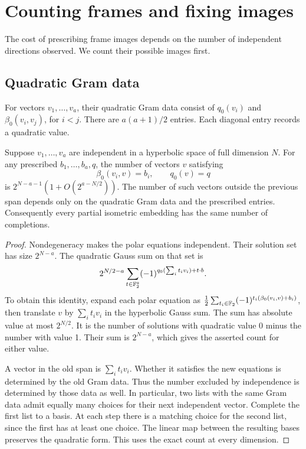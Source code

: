 \section{Counting frames and fixing images}\label{sec:frame-laws}

The cost of prescribing frame images depends on the number of independent
directions observed. We count their possible images first.

\subsection{Quadratic Gram data}

For vectors \(v_1,\ldots,v_a\), their quadratic Gram data consist of
\(q_0(v_i)\) and \(\beta_0(v_i,v_j)\), for \(i<j\).
There are \(a(a+1)/2\) entries. Each diagonal entry records a quadratic value.

\begin{lemma}\label{lem:quadratic-frame-count}
Suppose \(v_1,\ldots,v_a\) are independent in a hyperbolic space of
full dimension \(N\). For any prescribed \(b_1,\ldots,b_a,q\), the
number of vectors \(v\) satisfying
\[
 \beta_0(v_i,v)=b_i,\qquad q_0(v)=q
\]
is \(2^{N-a-1}(1+O(2^{a-N/2}))\). The number of such vectors outside
the previous span depends only on the quadratic Gram data and the
prescribed entries. Consequently every partial isometric embedding has
the same number of completions.
\end{lemma}
\begin{proof}
Nondegeneracy makes the polar equations independent. Their solution set
has size \(2^{N-a}\). The quadratic Gauss sum on that set is
\[
 2^{N/2-a}\sum_{t\in\mathbb F_2^a}
 (-1)^{q_0(\sum_i t_iv_i)+t\cdot b}.
\]
To obtain this identity, expand each polar equation as
\(\frac12\sum_{t_i\in\mathbb F_2}(-1)^{t_i(\beta_0(v_i,v)+b_i)}\),
then translate \(v\) by \(\sum_i t_iv_i\) in the hyperbolic Gauss sum.
The sum has absolute value at most \(2^{N/2}\). It is the number of
solutions with quadratic value 0 minus the number with value 1. Their
sum is \(2^{N-a}\), which gives the asserted count for either value.

A vector in the old span is \(\sum_i t_iv_i\). Whether it satisfies the
new equations is determined by the old Gram data. Thus the number excluded
by independence is determined by those data as well. In particular,
two lists with the same Gram data admit equally many choices for their
next independent vector. Complete the first list to a basis. At each step
there is a matching choice for the second list, since the first has at
least one choice. The linear map between the resulting bases preserves
the quadratic form. This uses the exact count at every dimension.
\end{proof}

